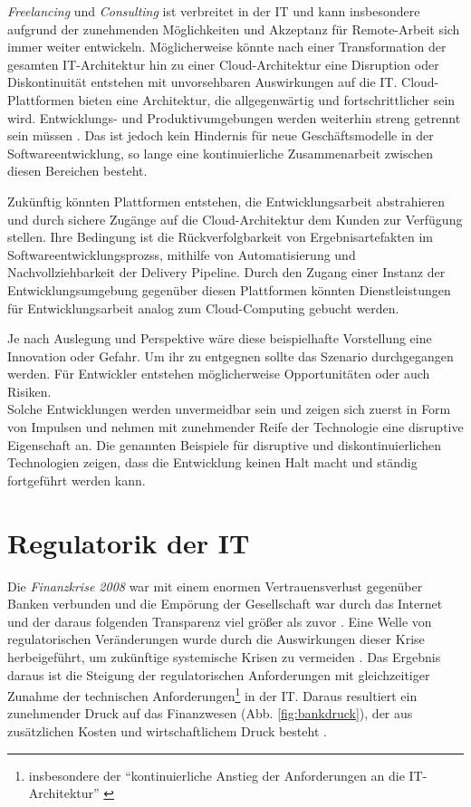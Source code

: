 \emph{Freelancing} und \emph{Consulting} ist verbreitet in der IT und kann insbesondere aufgrund der zunehmenden Möglichkeiten und Akzeptanz für Remote-Arbeit sich immer weiter entwickeln. Möglicherweise könnte nach einer Transformation der gesamten IT-Architektur hin zu einer Cloud-Architektur eine Disruption oder Diskontinuität entstehen mit unvorsehbaren Auswirkungen auf die IT. Cloud-Plattformen bieten eine Architektur, die allgegenwärtig und fortschrittlicher sein wird. Entwicklungs- und Produktivumgebungen werden weiterhin streng getrennt sein müssen \cite{MaRisk:2017}. Das ist jedoch kein Hindernis für neue Geschäftsmodelle in der Softwareentwicklung, so lange eine kontinuierliche Zusammenarbeit zwischen diesen Bereichen besteht.

Zukünftig könnten Plattformen entstehen, die Entwicklungsarbeit abstrahieren und durch sichere Zugänge auf die Cloud-Architektur dem Kunden zur Verfügung stellen. Ihre Bedingung ist die Rückverfolgbarkeit von Ergebnisartefakten im Softwareentwicklungsprozss, mithilfe von Automatisierung und Nachvollziehbarkeit der Delivery Pipeline. Durch den Zugang einer Instanz der Entwicklungsumgebung gegenüber diesen Plattformen könnten Dienstleistungen für Entwicklungsarbeit analog zum Cloud-Computing gebucht werden.

Je nach Auslegung und Perspektive wäre diese beispielhafte Vorstellung eine Innovation oder Gefahr. Um ihr zu entgegnen sollte das Szenario durchgegangen werden. Für Entwickler entstehen möglicherweise Opportunitäten oder auch Risiken. 
\medskip
\\
Solche Entwicklungen werden unvermeidbar sein und zeigen sich zuerst in Form von Impulsen \cite{Bussmann2006} und nehmen mit zunehmender Reife der Technologie eine disruptive Eigenschaft an. Die genannten Beispiele für disruptive und diskontinuierlichen Technologien zeigen, dass die Entwicklung keinen Halt macht und ständig fortgeführt werden kann.

\section{Regulatorik der IT}
Die \emph{Finanzkrise 2008} war mit einem enormen Vertrauensverlust gegenüber Banken verbunden und die Empörung der Gesellschaft war durch das Internet und der daraus folgenden Transparenz viel größer als zuvor \cite{Eismann2015}. Eine Welle von regulatorischen Veränderungen wurde durch die Auswirkungen dieser Krise herbeigeführt, um zukünftige systemische Krisen zu vermeiden \cite{Gupta:2017}. Das Ergebnis daraus ist die Steigung der regulatorischen Anforderungen mit gleichzeitiger Zunahme der technischen Anforderungen\footnote{insbesondere der \enquote{kontinuierliche Anstieg der Anforderungen an die IT-Architektur} \cite{Disterer2013}} in der IT. 
Daraus resultiert ein zunehmender Druck auf das Finanzwesen (Abb. \ref{fig:bankdruck}), der aus zusätzlichen Kosten und wirtschaftlichem Druck besteht \cite{Smolinski2017}.

